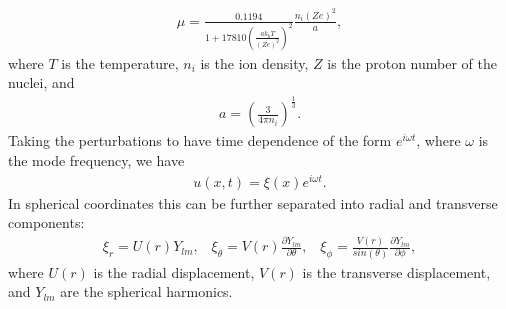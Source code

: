 \documentclass[fleqn,usenatbib]{mnras}
\begin{document}
\begin{align}
\mu=\frac{0.1194}{1+17810\left(\frac{ak_bT}{\left(Ze\right)^2}\right)^2}\frac{n_i\left(Ze\right)^2}{a},
\label{eq:mu_1991}
\end{align}
\noindent where $T$ is the temperature, $n_i$ is the ion density, $Z$ is the proton number of the nuclei, and 
\begin{align}
a=\left(\frac{3}{4\pi n_i}\right)^{\frac{1}{3}}.
\label{eq:mu_1991_a}
\end{align}
\noindent Taking the perturbations to have time dependence of the form $e^{i\omega t}$, where $\omega$ is the mode frequency, we have 
\begin{align}
u(x,t)=\xi(x)e^{i\omega t}.
\label{eq:time_seperation}
\end{align}
\noindent In spherical coordinates this can be further separated into radial and transverse components:
\begin{align}
\xi_r=U(r)Y_{lm},\;\;\;\xi_{\theta}=V(r)\frac{\partial Y_{lm}}{\partial\theta},\;\;\;\xi_{\phi}=\frac{V(r)}{sin(\theta)}\frac{\partial Y_{lm}}{\partial\phi},
\label{eq:xi_seperation}
\end{align}
\noindent where $U(r)$ is the radial displacement, $V(r)$ is the transverse displacement, and $Y_{lm}$ are the spherical harmonics.
\end{document}
